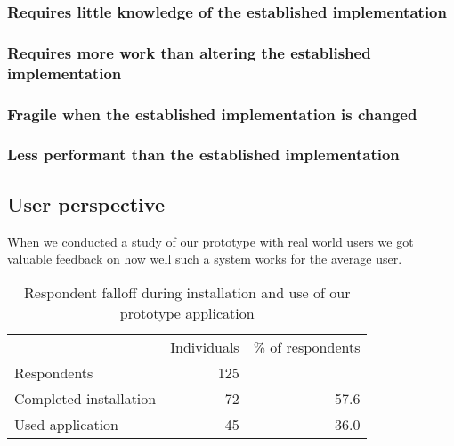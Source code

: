 \subsubsection{Requires little knowledge of the established implementation}

\subsubsection{Requires more work than altering the established
  implementation}

\subsubsection{Fragile when the established implementation is changed}

\subsubsection{Less performant than the established implementation}

\subsection{User perspective}

When we conducted a study of our prototype with real world users
we got valuable feedback on how well such a system works for the average user.

\begin{table}[h]
  \begin{tabular}{lrr}

    &
    \multicolumn{1}{c}{Individuals} &
    \multicolumn{1}{c}{\% of respondents} \\

    \cmidrule(lr){2-2}
    \cmidrule(lr){3-3}

    Respondents &
    125 &
    \\

    Completed installation &
    72 &
    57.6 \\

    Used application &
    45 &
    36.0 \\

  \end{tabular}
  \caption[Respondents Falloff]{%
    Respondent falloff during installation and use of our prototype
    application}
  \label{table:respondents.falloff}
\end{table}

